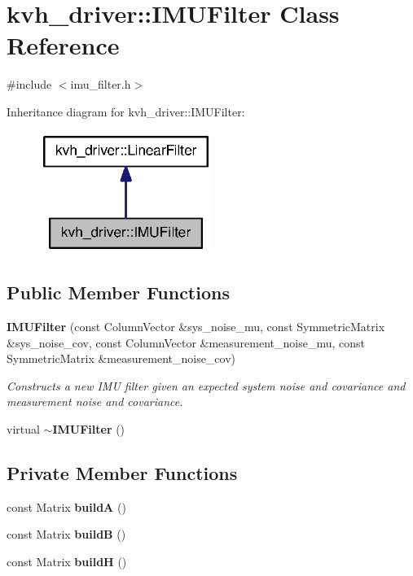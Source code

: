 \section{kvh\-\_\-driver\-:\-:\-I\-M\-U\-Filter \-Class \-Reference}
\label{classkvh__driver_1_1IMUFilter}


{\ttfamily \#include $<$imu\-\_\-filter.\-h$>$}



\-Inheritance diagram for kvh\-\_\-driver\-:\-:\-I\-M\-U\-Filter\-:
\nopagebreak
\begin{figure}[H]
\begin{center}
\leavevmode
\includegraphics[width=160pt]{classkvh__driver_1_1IMUFilter__inherit__graph}
\end{center}
\end{figure}
\subsection*{\-Public \-Member \-Functions}
\begin{DoxyCompactItemize}
\item 
{\bf \-I\-M\-U\-Filter} (const \-Column\-Vector \&sys\-\_\-noise\-\_\-mu, const \-Symmetric\-Matrix \&sys\-\_\-noise\-\_\-cov, const \-Column\-Vector \&measurement\-\_\-noise\-\_\-mu, const \-Symmetric\-Matrix \&measurement\-\_\-noise\-\_\-cov)
\begin{DoxyCompactList}\small\item\em \-Constructs a new \-I\-M\-U filter given an expected system noise and covariance and measurement noise and covariance. \end{DoxyCompactList}\item 
virtual {\bf $\sim$\-I\-M\-U\-Filter} ()
\end{DoxyCompactItemize}
\subsection*{\-Private \-Member \-Functions}
\begin{DoxyCompactItemize}
\item 
const \-Matrix {\bf build\-A} ()
\item 
const \-Matrix {\bf build\-B} ()
\item 
const \-Matrix {\bf build\-H} ()
\end{DoxyCompactItemize}


